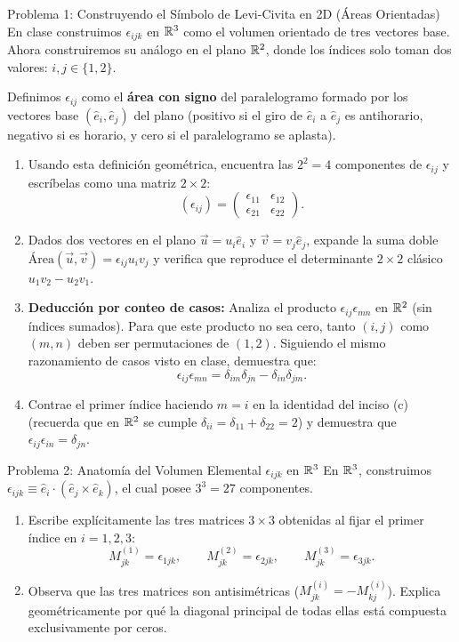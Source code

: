 \documentclass[11pt,letterpaper]{article}
\begin{document}
\begin{infobox}{Problema 1: Construyendo el Símbolo de Levi-Civita en 2D (Áreas Orientadas)}
En clase construimos $\epsilon_{ijk}$ en $\mathbb{R}^3$ como el volumen orientado de tres vectores base. Ahora construiremos su análogo en el plano $\mathbb{R}^2$, donde los índices solo toman dos valores: $i, j \in \{1, 2\}$.

Definimos $\epsilon_{ij}$ como el \textbf{área con signo} del paralelogramo formado por los vectores base $(\hat{e}_i, \hat{e}_j)$ del plano (positivo si el giro de $\hat{e}_i$ a $\hat{e}_j$ es antihorario, negativo si es horario, y cero si el paralelogramo se aplasta).
\begin{enumerate}[label=(\alph*)]
    \item Usando esta definición geométrica, encuentra las $2^2 = 4$ componentes de $\epsilon_{ij}$ y escríbelas como una matriz $2 \times 2$:
    \[
    (\epsilon_{ij}) = \begin{pmatrix} \epsilon_{11} & \epsilon_{12} \\ \epsilon_{21} & \epsilon_{22} \end{pmatrix}.
    \]
    \item Dados dos vectores en el plano $\vec{u} = u_i\hat{e}_i$ y $\vec{v} = v_j\hat{e}_j$, expande la suma doble $\text{Área}(\vec{u}, \vec{v}) = \epsilon_{ij} u_i v_j$ y verifica que reproduce el determinante $2 \times 2$ clásico $u_1 v_2 - u_2 v_1$.
    \item \textbf{Deducción por conteo de casos:} Analiza el producto $\epsilon_{ij}\epsilon_{mn}$ en $\mathbb{R}^2$ (sin índices sumados). Para que este producto no sea cero, tanto $(i,j)$ como $(m,n)$ deben ser permutaciones de $(1,2)$. Siguiendo el mismo razonamiento de casos visto en clase, demuestra que:
    \[
    \epsilon_{ij}\epsilon_{mn} = \delta_{im}\delta_{jn} - \delta_{in}\delta_{jm}.
    \]
    \item Contrae el primer índice haciendo $m = i$ en la identidad del inciso (c) (recuerda que en $\mathbb{R}^2$ se cumple $\delta_{ii} = \delta_{11} + \delta_{22} = 2$) y demuestra que $\epsilon_{ij}\epsilon_{in} = \delta_{jn}$.
\end{enumerate}
\end{infobox}

\begin{infobox}{Problema 2: Anatomía del Volumen Elemental $\epsilon_{ijk}$ en $\mathbb{R}^3$}
En $\mathbb{R}^3$, construimos $\epsilon_{ijk} \equiv \hat{e}_i \cdot (\hat{e}_j \times \hat{e}_k)$, el cual posee $3^3 = 27$ componentes.
\begin{enumerate}[label=(\alph*)]
    \item Escribe explícitamente las tres matrices $3 \times 3$ obtenidas al fijar el primer índice en $i = 1, 2, 3$:
    \[
    M^{(1)}_{jk} = \epsilon_{1jk}, \qquad M^{(2)}_{jk} = \epsilon_{2jk}, \qquad M^{(3)}_{jk} = \epsilon_{3jk}.
    \]
    \item Observa que las tres matrices son antisimétricas ($M^{(i)}_{jk} = -M^{(i)}_{kj}$). Explica geométricamente por qué la diagonal principal de todas ellas está compuesta exclusivamente por ceros.
\end{enumerate}
\end{infobox}
\end{document}
